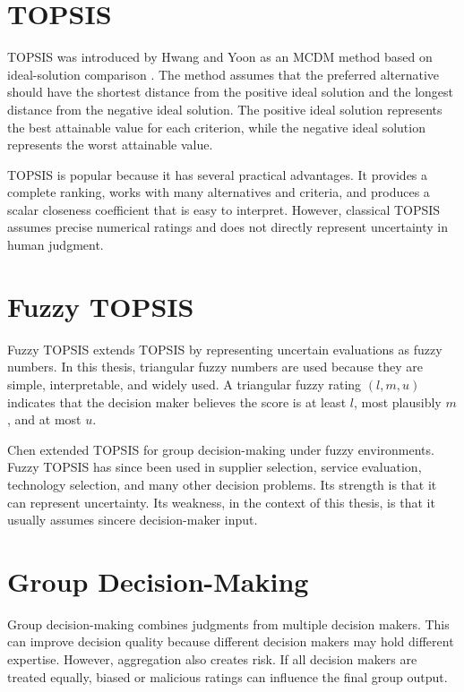 \section{TOPSIS}

TOPSIS was introduced by Hwang and Yoon as an MCDM method based on ideal-solution comparison \cite{hwang1981}. The method assumes that the preferred alternative should have the shortest distance from the positive ideal solution and the longest distance from the negative ideal solution. The positive ideal solution represents the best attainable value for each criterion, while the negative ideal solution represents the worst attainable value.

TOPSIS is popular because it has several practical advantages. It provides a complete ranking, works with many alternatives and criteria, and produces a scalar closeness coefficient that is easy to interpret. However, classical TOPSIS assumes precise numerical ratings and does not directly represent uncertainty in human judgment.

\section{Fuzzy TOPSIS}

Fuzzy TOPSIS extends TOPSIS by representing uncertain evaluations as fuzzy numbers. In this thesis, triangular fuzzy numbers are used because they are simple, interpretable, and widely used. A triangular fuzzy rating \((l,m,u)\) indicates that the decision maker believes the score is at least \(l\), most plausibly \(m\), and at most \(u\).

Chen \cite{chen2000} extended TOPSIS for group decision-making under fuzzy environments. Fuzzy TOPSIS has since been used in supplier selection, service evaluation, technology selection, and many other decision problems. Its strength is that it can represent uncertainty. Its weakness, in the context of this thesis, is that it usually assumes sincere decision-maker input.

\section{Group Decision-Making}

Group decision-making combines judgments from multiple decision makers. This can improve decision quality because different decision makers may hold different expertise. However, aggregation also creates risk. If all decision makers are treated equally, biased or malicious ratings can influence the final group output.

